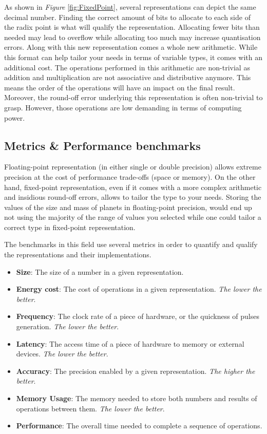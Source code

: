 As shown in \emph{Figure} \ref{fig:FixedPoint}, several representations can depict the same decimal number. Finding the correct amount of bits to allocate to each side of the radix point is what will qualify the representation. Allocating fewer bits than needed may lead to overflow while allocating too much may increase quantisation errors.
Along with this new representation comes a whole new arithmetic. While this format can help tailor your needs in terms of variable types, it comes with an additional cost. The operations performed in this arithmetic are non-trivial as addition and multiplication are not associative and distributive anymore. This means the order of the operations will have an impact on the final result. Moreover, the round-off error underlying this representation is often non-trivial to grasp. However, those operations are low demanding in terms of computing power.

\subsection{Metrics \& Performance benchmarks}

Floating-point representation (in either single or double precision) allows extreme precision at the cost of performance trade-offs (space or memory). On the other hand, fixed-point representation, even if it comes with a more complex arithmetic and insidious round-off errors, allows to tailor the type to your needs. Storing the values of the size and mass of planets in floating-point precision, would end up not using the majority of the range of values you selected while one could tailor a correct type in fixed-point representation.

The benchmarks in this field use several metrics in order to quantify and qualify the representations and their implementations.
\begin{itemize}
	\item \textbf{Size}: The size of a number in a given representation.
	\item \textbf{Energy cost}: The cost of operations in a given representation. \emph{The lower the better}.
	\item \textbf{Frequency}: The clock rate of a piece of hardware, or the quickness of pulses generation. \emph{The lower the better}.
	\item \textbf{Latency}: The access time of a piece of hardware to memory or external devices. \emph{The lower the better}.
	\item \textbf{Accuracy}: The precision enabled by a given representation. \emph{The higher the better}.
	\item \textbf{Memory Usage}: The memory needed to store both numbers and results of operations between them. \emph{The lower the better}.
	\item \textbf{Performance}: The overall time needed to complete a sequence of operations.
\end{itemize}


